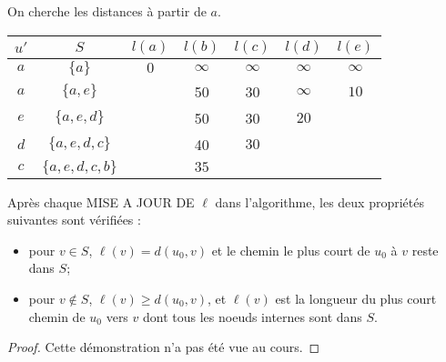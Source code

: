\begin{myexem}
  On cherche les distances à partir de $a$.\\
	\begin{center}
  \end{center}
  \begin{center}
    \begin{tabular}{|c|c|ccccc|}
      \hline
      $u'$ & $S$ & $l(a)$ & $l(b)$ & $l(c)$ & $l(d)$ & $l(e)$\\
      \hline
      $a$ & $\lbrace a \rbrace$ & $\boxed{0}$ & $\infty$ & $\infty$ & $\infty$ &$\infty$\\
      $a$ & $\lbrace a,e \rbrace$ && 50 & 30 & $\infty$ & $\boxed{10}$\\
      $e$ & $\lbrace a,e,d \rbrace$ && 50 & 30 & $\boxed{20}$ &\\
      $d$ & $\lbrace a,e,d,c \rbrace$ && 40 & $\boxed{30}$ & &\\
      $c$ & $\lbrace a,e,d,c,b \rbrace$ && $\boxed{35}$ & & &\\
      \hline
    \end{tabular}
  \end{center}
\end{myexem}

\begin{mytheo} 
  Après chaque MISE A JOUR DE $\ell$ dans l’algorithme, les deux propriétés suivantes sont vérifiées :
  \begin{itemize}
    \item pour $v \in S$, $\ell(v) = d(u_0, v)$ et le chemin le plus court de $u_0$ à $v$ reste dans $S$;
    \item pour $v \notin S$, $\ell(v) \geq d(u_0, v)$, et $\ell(v)$ est la longueur du plus court chemin de $u_0$ vers $v$ dont tous les noeuds internes sont dans $S$.
  \end{itemize}
  \begin{proof}
     Cette démonstration n'a pas été vue au cours.
  \end{proof}
\end{mytheo}

